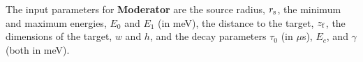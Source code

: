 The input parameters for {\bf Moderator} are the source radius, $r_{\rm s}$,
the minimum and maximum energies, $E_0$ and $E_1$ (in meV),
the distance to the target, $z_{\rm f}$, the dimensions of the target,
$w$ and $h$, and the decay parameters 
$\tau_0$ (in $\mu$s), $E_c$, and $\gamma$ (both in meV).






